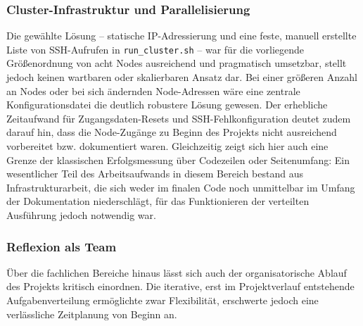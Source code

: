 \documentclass{article}
\begin{document}
\subsubsection{Cluster-Infrastruktur und Parallelisierung}
\label{sec:reflexion-cluster}
Die gewählte Lösung -- statische IP-Adressierung und eine feste,
manuell erstellte Liste von SSH-Aufrufen in \texttt{run\_cluster.sh} --
war für die vorliegende Größenordnung von acht Nodes ausreichend und
pragmatisch umsetzbar, stellt jedoch keinen wartbaren oder skalierbaren
Ansatz dar. Bei einer größeren Anzahl an Nodes oder bei sich ändernden
Node-Adressen wäre eine zentrale Konfigurationsdatei die deutlich
robustere Lösung gewesen. Der erhebliche Zeitaufwand für
Zugangsdaten-Resets und SSH-Fehlkonfiguration deutet zudem darauf hin,
dass die Node-Zugänge zu Beginn des Projekts nicht ausreichend
vorbereitet bzw. dokumentiert waren. Gleichzeitig zeigt sich hier auch
eine Grenze der klassischen Erfolgsmessung über Codezeilen oder
Seitenumfang: Ein wesentlicher Teil des Arbeitsaufwands in diesem Bereich
bestand aus Infrastrukturarbeit, die sich weder im finalen Code noch
unmittelbar im Umfang der Dokumentation niederschlägt, für das
Funktionieren der verteilten Ausführung jedoch notwendig war.

\subsubsection{Reflexion als Team}
\label{sec:reflexion-team}
Über die fachlichen Bereiche hinaus lässt sich auch der organisatorische
Ablauf des Projekts kritisch einordnen. Die iterative, erst im
Projektverlauf entstehende Aufgabenverteilung ermöglichte zwar
Flexibilität, erschwerte jedoch eine verlässliche Zeitplanung von Beginn
an.
\end{document}
